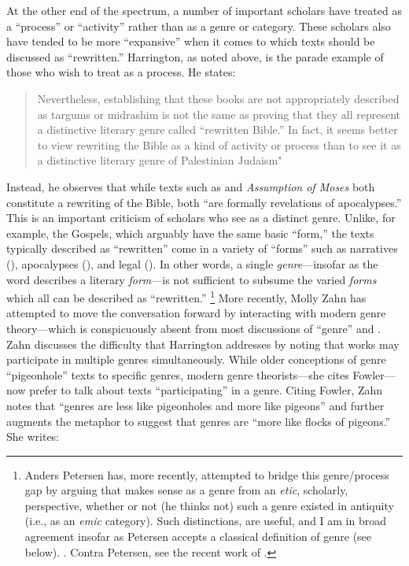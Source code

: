 At the other end of the spectrum, a number of important scholars have treated \rwb as a ``process'' or ``activity'' rather than as a genre or category. These scholars also have tended to be more ``expansive'' when it comes to which texts should be discussed as ``rewritten.'' Harrington, as noted above, is the parade example of those who wish to treat \rwb as a process. He states: 

\begin{quote}
    Nevertheless, establishing that these books are not appropriately described as targums or midrashim is not the same as proving that they all represent a distinctive literary genre called ``rewritten Bible.'' In fact, it seems better to view rewriting the Bible as a kind of activity or process than to see it as a distinctive literary genre of Palestinian Judaism"\autocite[242--243]{harrington_kraft-nickelsburg1986}
\end{quote} 

Instead, he observes that while texts such as \jub and \emph{Assumption of Moses} both constitute a rewriting of the Bible, both ``are formally revelations of apocalypses.''\autocite[243]{harrington_kraft-nickelsburg1986} This is an important criticism of scholars who see \rwb as a distinct genre. Unlike, for example, the Gospels, which arguably have the same basic ``form,'' the texts typically described as ``rewritten'' come in a variety of ``forms'' such as narratives (\ga), apocalypses (\jub), and legal (\templescroll). In other words, a single \emph{genre}---insofar as the word describes a literary \emph{form}---is not sufficient to subsume the varied \emph{forms} which all can be described as ``rewritten.''%
%
\footnote{Anders Petersen has, more recently, attempted to bridge this genre/process gap by arguing that \rwb makes sense as a genre from an \emph{etic}, scholarly, perspective, whether or not (he thinks not) such a genre existed in antiquity (i.e., as an \emph{emic} category). Such distinctions, are useful, and I am in broad agreement insofar as Petersen accepts a classical definition of genre (see below). \cite{petersen_hilhorst-puech2007}. Contra Petersen, see the recent work of \cite{tino_jsj2018}.}
%
More recently, Molly Zahn has attempted to move the conversation forward by interacting with modern genre theory---which is conspicuously absent from most discussions of ``genre'' and \rwb.\autocites{zahn_jbl2012}[Daniel Machiela noted the absence of genre theory in his 2010 article, as well, see][]{machiela_jjs2010}[Notable exceptions include][]{brooke_dsd2010} Zahn discusses the difficulty that Harrington addresses by noting that works may participate in multiple genres simultaneously. While older conceptions of genre ``pigeonhole'' texts to specific genres, modern genre theorists---she cites Fowler---now prefer to talk about texts ``participating'' in a genre. Citing Fowler, Zahn notes that ``genres are less like pigeonholes and more like pigeons'' and further augments the metaphor to suggest that genres are ``more like flocks of pigeons.'' She writes: 

